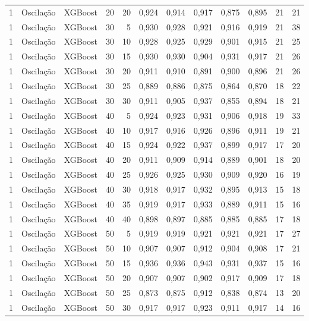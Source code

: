 \begin{longtable}{@{}rllrrrrrrrrr@{}}
1 & Oscilação & XGBoost & 20 & 20 & 0,924 & 0,914 & 0,917 & 0,875 & 0,895 & 21 & 21 \\
1 & Oscilação & XGBoost & 30 & 5 & 0,930 & 0,928 & 0,921 & 0,916 & 0,919 & 21 & 38 \\
1 & Oscilação & XGBoost & 30 & 10 & 0,928 & 0,925 & 0,929 & 0,901 & 0,915 & 21 & 25 \\
1 & Oscilação & XGBoost & 30 & 15 & 0,930 & 0,930 & 0,904 & 0,931 & 0,917 & 21 & 26 \\
1 & Oscilação & XGBoost & 30 & 20 & 0,911 & 0,910 & 0,891 & 0,900 & 0,896 & 21 & 26 \\
1 & Oscilação & XGBoost & 30 & 25 & 0,889 & 0,886 & 0,875 & 0,864 & 0,870 & 18 & 22 \\
1 & Oscilação & XGBoost & 30 & 30 & 0,911 & 0,905 & 0,937 & 0,855 & 0,894 & 18 & 21 \\
1 & Oscilação & XGBoost & 40 & 5 & 0,924 & 0,923 & 0,931 & 0,906 & 0,918 & 19 & 33 \\
1 & Oscilação & XGBoost & 40 & 10 & 0,917 & 0,916 & 0,926 & 0,896 & 0,911 & 19 & 21 \\
1 & Oscilação & XGBoost & 40 & 15 & 0,924 & 0,922 & 0,937 & 0,899 & 0,917 & 17 & 20 \\
1 & Oscilação & XGBoost & 40 & 20 & 0,911 & 0,909 & 0,914 & 0,889 & 0,901 & 18 & 20 \\
1 & Oscilação & XGBoost & 40 & 25 & 0,926 & 0,925 & 0,930 & 0,909 & 0,920 & 16 & 19 \\
1 & Oscilação & XGBoost & 40 & 30 & 0,918 & 0,917 & 0,932 & 0,895 & 0,913 & 15 & 18 \\
1 & Oscilação & XGBoost & 40 & 35 & 0,919 & 0,917 & 0,933 & 0,889 & 0,911 & 15 & 16 \\
1 & Oscilação & XGBoost & 40 & 40 & 0,898 & 0,897 & 0,885 & 0,885 & 0,885 & 17 & 18 \\
1 & Oscilação & XGBoost & 50 & 5 & 0,919 & 0,919 & 0,921 & 0,921 & 0,921 & 17 & 27 \\
1 & Oscilação & XGBoost & 50 & 10 & 0,907 & 0,907 & 0,912 & 0,904 & 0,908 & 17 & 21 \\
1 & Oscilação & XGBoost & 50 & 15 & 0,936 & 0,936 & 0,943 & 0,931 & 0,937 & 15 & 16 \\
1 & Oscilação & XGBoost & 50 & 20 & 0,907 & 0,907 & 0,902 & 0,917 & 0,909 & 17 & 18 \\
1 & Oscilação & XGBoost & 50 & 25 & 0,873 & 0,875 & 0,912 & 0,838 & 0,874 & 13 & 20 \\
1 & Oscilação & XGBoost & 50 & 30 & 0,917 & 0,917 & 0,923 & 0,911 & 0,917 & 14 & 16 \\

\end{longtable}
